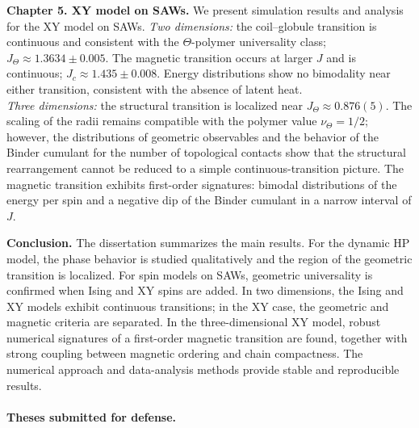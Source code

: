 \medskip
\noindent\textbf{Chapter 5. XY model on SAWs.}
We present simulation results and analysis for the XY model on SAWs. 
\emph{Two dimensions:} the coil--globule transition is continuous and consistent with the $\Theta$-polymer universality class; $J_{\Theta}\approx 1.3634\pm 0.005$. The magnetic transition occurs at larger $J$ and is continuous; $J_{c}\approx 1.435\pm 0.008$. Energy distributions show no bimodality near either transition, consistent with the absence of latent heat.\\
\emph{Three dimensions:} the structural transition is localized near $J_{\Theta}\approx 0.876(5)$. The scaling of the radii remains compatible with the polymer value $\nu_{\Theta}=1/2$; however, the distributions of geometric observables and the behavior of the Binder cumulant for the number of topological contacts show that the structural rearrangement cannot be reduced to a simple continuous-transition picture. The magnetic transition exhibits first-order signatures: bimodal distributions of the energy per spin and a negative dip of the Binder cumulant in a narrow interval of $J$.

\medskip
\noindent\textbf{Conclusion.}
The dissertation summarizes the main results. For the dynamic HP model, the phase behavior is studied qualitatively and the region of the geometric transition is localized. For spin models on SAWs, geometric universality is confirmed when Ising and XY spins are added. In two dimensions, the Ising and XY models exhibit continuous transitions; in the XY case, the geometric and magnetic criteria are separated. In the three-dimensional XY model, robust numerical signatures of a first-order magnetic transition are found, together with strong coupling between magnetic ordering and chain compactness. The numerical approach and data-analysis methods provide stable and reproducible results.


\paragraph*{Theses submitted for defense.}

